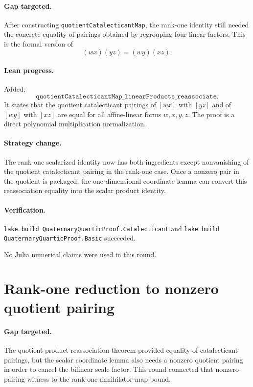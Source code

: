 \documentclass[11pt]{article}
\begin{document}
\paragraph{Gap targeted.}
After constructing \texttt{quotientCatalecticantMap}, the rank-one identity
still needed the concrete equality of pairings obtained by regrouping four
linear factors.  This is the formal version of
\[
(wx)(yz)=(wy)(xz).
\]

\paragraph{Lean progress.}
Added:
\[
\texttt{quotientCatalecticantMap\_linearProducts\_reassociate}.
\]
It states that the quotient catalecticant pairings of \([wx]\) with \([yz]\)
and of \([wy]\) with \([xz]\) are equal for all affine-linear forms
\(w,x,y,z\).  The proof is a direct polynomial multiplication normalization.

\paragraph{Strategy change.}
The rank-one scalarized identity now has both ingredients except nonvanishing
of the quotient catalecticant pairing in the rank-one case.  Once a nonzero
pair in the quotient is packaged, the one-dimensional coordinate lemma can
convert this reassociation equality into the scalar product identity.

\paragraph{Verification.}
\texttt{lake build QuaternaryQuarticProof.Catalecticant} and
\texttt{lake build QuaternaryQuarticProof.Basic} succeeded.

No Julia numerical claims were used in this round.

\section*{Rank-one reduction to nonzero quotient pairing}

\paragraph{Gap targeted.}
The quotient product reassociation theorem provided equality of catalecticant
pairings, but the scalar coordinate lemma also needs a nonzero quotient
pairing in order to cancel the bilinear scale factor.  This round connected
that nonzero-pairing witness to the rank-one annihilator-map bound.
\end{document}
